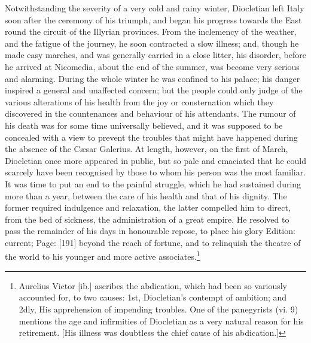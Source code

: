 Notwithstanding the severity of a very cold and rainy winter, Diocletian left Italy soon after the ceremony of his triumph, and began his progress towards the East round the circuit of the Illyrian provinces. From the inclemency of the weather, and the fatigue of the journey, he soon contracted a slow illness; and, though he made easy marches, and was generally carried in a close litter, his disorder, before he arrived at Nicomedia, about the end of the summer, was become very serious and alarming. During the whole winter he was confined to his palace; his danger inspired a general and unaffected concern; but the people could only judge of the various alterations of his health from the joy or consternation which they discovered in the countenances and behaviour of his attendants. The rumour of his death was for some time universally believed, and it was supposed to be concealed with a view to prevent the troubles that might have happened during the absence of the Cæsar Galerius. At length, however, on the first of March, Diocletian once more appeared in public, but so pale and emaciated that he could scarcely have been recognised by those to whom his person was the most familiar. It was time to put an end to the painful struggle, which he had sustained during more than a year, between the care of his health and that of his dignity. The former required indulgence and relaxation, the latter compelled him to direct, from the bed of sickness, the administration of a great empire. He resolved to pass the remainder of his days in honourable repose, to place his glory Edition: current; Page: [191] beyond the reach of fortune, and to relinquish the theatre of the world to his younger and more active associates.\footnote{Aurelius Victor [ib.] ascribes the abdication, which had been so variously accounted for, to two causes: 1st, Diocletian\texthebrew{}’s contempt of ambition; and 2dly, His apprehension of impending troubles. One of the panegyrists (vi. 9) mentions the age and infirmities of Diocletian as a very natural reason for his retirement. [His illness was doubtless the chief cause of his abdication.]}

